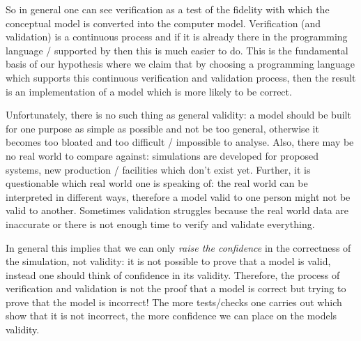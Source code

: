 
So in general one can see verification as a test of the fidelity with which the conceptual model is converted into the computer model. Verification (and validation) is a continuous process and if it is already there in the programming language / supported by then this is much easier to do. This is the fundamental basis of our hypothesis where we claim that by choosing a programming language which supports this continuous verification and validation process, then the result is an implementation of a model which is more likely to be correct.

Unfortunately, there is no such thing as general validity: a model should be built for one purpose as simple as possible and not be too general, otherwise it becomes too bloated and too difficult / impossible to analyse. Also, there may be no real world to compare against: simulations are developed for proposed systems, new production / facilities which don't exist yet. Further, it is questionable which real world one is speaking of: the real world can be interpreted in different ways, therefore a model valid to one person might not be valid to another. Sometimes validation struggles because the real world data are inaccurate or there is not enough time to verify and validate everything.

In general this implies that we can only \textit{raise the confidence} in the correctness of the simulation, not validity: it is not possible to prove that a model is valid, instead one should think of confidence in its validity. Therefore, the process of verification and validation is not the proof that a model is correct but trying to prove that the model is incorrect! The more tests/checks one carries out which show that it is not incorrect, the more confidence we can place on the models validity.

%		
%		

